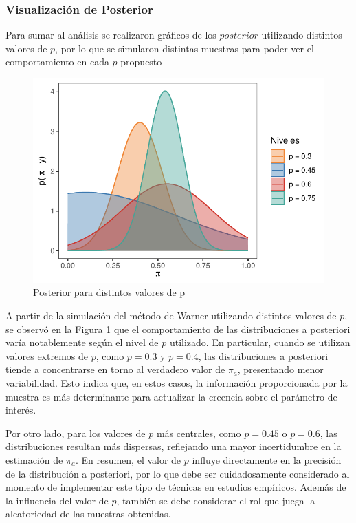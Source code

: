 \documentclass[
]{article}
\begin{document}
\newpage

\subsubsection{Visualización de Posterior}\label{subtitulo-7}

Para sumar al análisis se realizaron gráficos de los \(posterior\) utilizando
distintos valores de \(p\), por lo que se simularon distintas muestras para
poder ver el comportamiento en cada \(p\) propuesto

\begin{figure}

{\centering \includegraphics{TP-1--Bayes_files/figure-latex/fig4-1} 

}

\caption{Posterior para distintos valores de p}\label{fig:fig4}
\end{figure}

A partir de la simulación del método de Warner utilizando distintos valores de \(p\), se observó en la Figura \ref{fig:fig4} que el comportamiento de las distribuciones a posteriori varía notablemente según el nivel de \(p\) utilizado. En particular, cuando se utilizan valores extremos de \(p\), como \(p = 0.3\) y \(p = 0.4\), las distribuciones a posteriori tiende a concentrarse en torno al verdadero valor de \(\pi_a\), presentando menor variabilidad. Esto indica que, en estos casos, la información proporcionada por la muestra es más determinante para actualizar la creencia sobre el parámetro de interés.

Por otro lado, para los valores de \(p\) más centrales, como \(p = 0.45\) o \(p = 0.6\), las distribuciones resultan más dispersas, reflejando una mayor incertidumbre en la estimación de \(\pi_a\). En resumen, el valor de \(p\) influye directamente en la precisión de la distribución a posteriori, por lo que debe ser cuidadosamente considerado al momento de implementar este tipo de técnicas en estudios empíricos. Además de la influencia del valor de \(p\), también se debe considerar el rol que juega la aleatoriedad de las muestras obtenidas.
\end{document}
